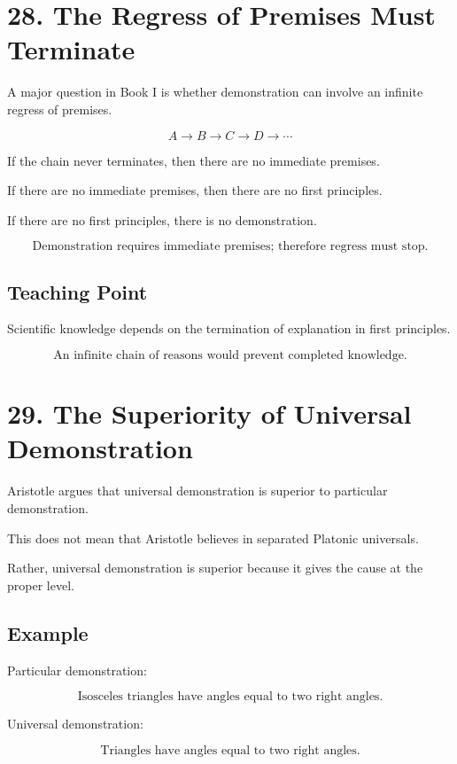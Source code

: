 \documentclass[12pt]{article}
\begin{document}
\section*{28. The Regress of Premises Must Terminate}

A major question in Book I is whether demonstration can involve an infinite
regress of premises.

\[
A \rightarrow B \rightarrow C \rightarrow D \rightarrow \cdots
\]

If the chain never terminates, then there are no immediate premises.

If there are no immediate premises, then there are no first principles.

If there are no first principles, there is no demonstration.

\[
\boxed{
\text{Demonstration requires immediate premises; therefore regress must stop.}
}
\]

\subsection*{Teaching Point}

Scientific knowledge depends on the termination of explanation in first
principles.

\[
\boxed{
\text{An infinite chain of reasons would prevent completed knowledge.}
}
\]

\section*{29. The Superiority of Universal Demonstration}

Aristotle argues that universal demonstration is superior to particular
demonstration.

This does not mean that Aristotle believes in separated Platonic universals.

Rather, universal demonstration is superior because it gives the cause at the
proper level.

\subsection*{Example}

Particular demonstration:

\[
\text{Isosceles triangles have angles equal to two right angles.}
\]

Universal demonstration:

\[
\text{Triangles have angles equal to two right angles.}
\]
\end{document}
